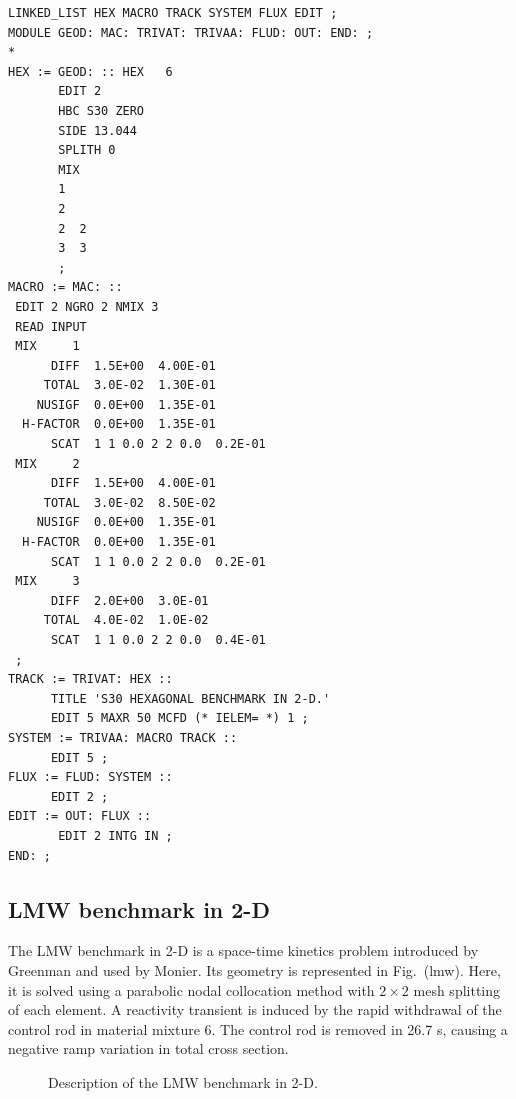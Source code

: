 \begin{verbatim}
LINKED_LIST HEX MACRO TRACK SYSTEM FLUX EDIT ;
MODULE GEOD: MAC: TRIVAT: TRIVAA: FLUD: OUT: END: ;
*
HEX := GEOD: :: HEX   6
       EDIT 2
       HBC S30 ZERO
       SIDE 13.044
       SPLITH 0
       MIX
       1
       2
       2  2
       3  3
       ;
MACRO := MAC: ::
 EDIT 2 NGRO 2 NMIX 3
 READ INPUT
 MIX     1
      DIFF  1.5E+00  4.00E-01
     TOTAL  3.0E-02  1.30E-01
    NUSIGF  0.0E+00  1.35E-01
  H-FACTOR  0.0E+00  1.35E-01
      SCAT  1 1 0.0 2 2 0.0  0.2E-01
 MIX     2
      DIFF  1.5E+00  4.00E-01
     TOTAL  3.0E-02  8.50E-02
    NUSIGF  0.0E+00  1.35E-01
  H-FACTOR  0.0E+00  1.35E-01
      SCAT  1 1 0.0 2 2 0.0  0.2E-01
 MIX     3
      DIFF  2.0E+00  3.0E-01
     TOTAL  4.0E-02  1.0E-02
      SCAT  1 1 0.0 2 2 0.0  0.4E-01
 ;
TRACK := TRIVAT: HEX ::
      TITLE 'S30 HEXAGONAL BENCHMARK IN 2-D.'
      EDIT 5 MAXR 50 MCFD (* IELEM= *) 1 ;
SYSTEM := TRIVAA: MACRO TRACK ::
      EDIT 5 ;
FLUX := FLUD: SYSTEM ::
      EDIT 2 ;
EDIT := OUT: FLUX ::
       EDIT 2 INTG IN ;
END: ;
\end{verbatim}

\subsection{LMW benchmark in 2-D}

The LMW benchmark in 2-D is a space-time kinetics problem introduced by Greenman\cite{greenman} and used by Monier\cite{monier}.
Its geometry is represented in Fig.~\fig(lmw). Here, it is solved using a parabolic nodal collocation method with $2\times 2$ mesh splitting
of each element. A reactivity transient is induced by the rapid withdrawal of the control rod in material mixture 6. The control rod is
removed in 26.7 s, causing a negative ramp variation in total cross section.

\begin{figure}[htbp]
\begin{center} 
\epsfxsize=7cm
\centerline{ }
\parbox{14cm}{\caption{Description of the LMW benchmark in 2-D.}\label{fig:lmw}}  \end{center} 
\end{figure}

